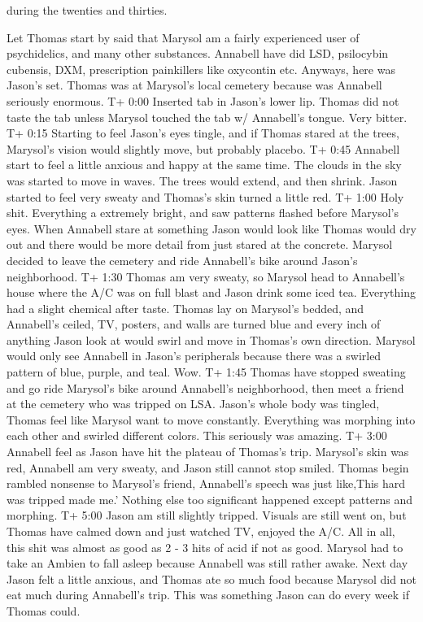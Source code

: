\documentclass[12pt]{book}
\begin{document}
during the twenties and thirties.



Let Thomas start by said that Marysol am a fairly experienced user of psychidelics, and many other substances. Annabell have did LSD, psilocybin cubensis, DXM, prescription painkillers like oxycontin etc. Anyways, here was Jason's set. Thomas was at Marysol's local cemetery because was Annabell seriously enormous. T+ 0:00 Inserted tab in Jason's lower lip. Thomas did not taste the tab unless Marysol touched the tab w/ Annabell's tongue. Very bitter. T+ 0:15 Starting to feel Jason's eyes tingle, and if Thomas stared at the trees, Marysol's vision would slightly move, but probably placebo. T+ 0:45 Annabell start to feel a little anxious and happy at the same time. The clouds in the sky was started to move in waves. The trees would extend, and then shrink. Jason started to feel very sweaty and Thomas's skin turned a little red. T+ 1:00 Holy shit. Everything a extremely bright, and saw patterns flashed before Marysol's eyes. When Annabell stare at something Jason would look like Thomas would dry out and there would be more detail from just stared at the concrete. Marysol decided to leave the cemetery and ride Annabell's bike around Jason's neighborhood. T+ 1:30 Thomas am very sweaty, so Marysol head to Annabell's house where the A/C was on full blast and Jason drink some iced tea. Everything had a slight chemical after taste. Thomas lay on Marysol's bedded, and Annabell's ceiled, TV, posters, and walls are turned blue and every inch of anything Jason look at would swirl and move in Thomas's own direction. Marysol would only see Annabell in Jason's peripherals because there was a swirled pattern of blue, purple, and teal. Wow. T+ 1:45 Thomas have stopped sweating and go ride Marysol's bike around Annabell's neighborhood, then meet a friend at the cemetery who was tripped on LSA. Jason's whole body was tingled, Thomas feel like Marysol want to move constantly. Everything was morphing into each other and swirled different colors. This seriously was amazing. T+ 3:00 Annabell feel as Jason have hit the plateau of Thomas's trip. Marysol's skin was red, Annabell am very sweaty, and Jason still cannot stop smiled. Thomas begin rambled nonsense to Marysol's friend, Annabell's speech was just like,This hard was tripped made me.' Nothing else too significant happened except patterns and morphing. T+ 5:00 Jason am still slightly tripped. Visuals are still went on, but Thomas have calmed down and just watched TV, enjoyed the A/C. All in all, this shit was almost as good as 2 - 3 hits of acid if not as good. Marysol had to take an Ambien to fall asleep because Annabell was still rather awake. Next day Jason felt a little anxious, and Thomas ate so much food because Marysol did not eat much during Annabell's trip. This was something Jason can do every week if Thomas could.
\end{document}
